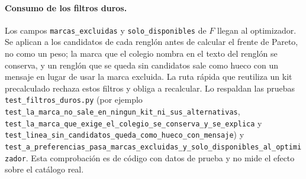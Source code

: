 \documentclass[11pt,letterpaper]{article}
\newcommand{\cod}[1]{\texttt{#1}}
\begin{document}
\paragraph{Consumo de los filtros duros.} Los campos \cod{marcas\_excluidas} y \cod{solo\_disponibles} de $F$ llegan al
optimizador. Se aplican a los candidatos de cada rengl\'on antes de calcular el frente de Pareto, no como un peso; la marca que el
colegio nombra en el texto del rengl\'on se conserva, y un rengl\'on que se queda sin candidatos sale como hueco con un mensaje en
lugar de usar la marca excluida. La ruta r\'apida que reutiliza un kit precalculado rechaza estos filtros y obliga a recalcular. Lo
respaldan las pruebas \cod{test\_filtros\_duros.py} (por ejemplo \cod{test\_la\_marca\_no\_sale\_en\_ningun\_kit\_ni\_sus\_alternativas},
\cod{test\_la\_marca\_que\_exige\_el\_colegio\_se\_conserva\_y\_se\_explica} y
\cod{test\_linea\_sin\_candidatos\_queda\_como\_hueco\_con\_mensaje}) y \cod{test\_a\_preferencias\_pasa\_marcas\_excluidas\_y\_solo\_disponibles\_al\_optimizador}.
Esta comprobaci\'on es de c\'odigo con datos de prueba y no mide el efecto sobre el cat\'alogo real.



\end{document}

